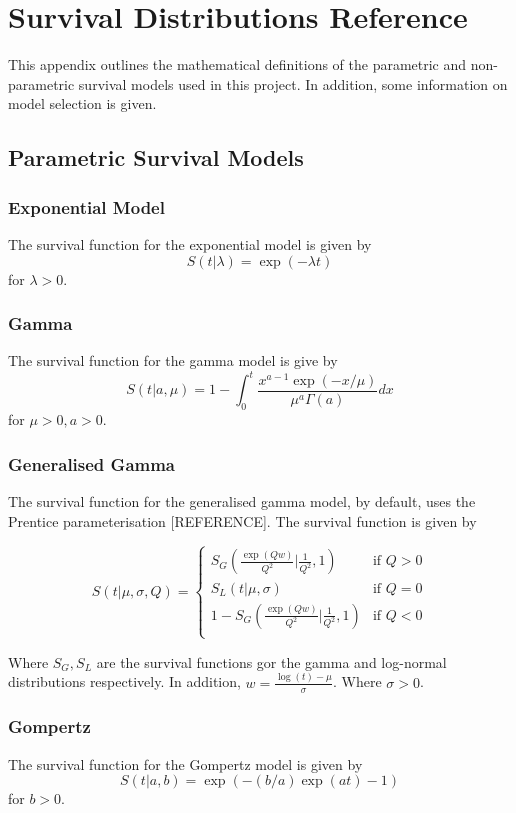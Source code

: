 \chapter{Survival Distributions Reference}

This appendix outlines the mathematical definitions of the parametric and non-parametric survival models used in this project. In addition, some information on model selection is given. 

\section{Parametric Survival Models}\label{flexsurvDists}

\subsection{Exponential Model}
The survival function for the exponential model is given by \[S(t|\lambda) = \exp(-\lambda t)\] for $\lambda > 0$.

\subsection{Gamma}
The survival function for the gamma model is give by \[S(t|a,\mu) = 1 - \int_{0}^{t}\frac{x^{a-1}\exp(-x/ \mu)}{\mu^a \Gamma(a)}dx\] for $\mu > 0, a > 0$.

\subsection{Generalised Gamma}
The survival function for the generalised gamma model, by default, uses the Prentice parameterisation [REFERENCE]. The survival function is given by 

\[
S(t|\mu, \sigma, Q) = \begin{cases}
    S_G(\frac{\exp(Qw)}{Q^2}|\frac{1}{Q^2}, 1) & \text{if } Q > 0 \\
    S_L(t | \mu, \sigma) & \text{if } Q = 0 \\
    1 - S_G(\frac{\exp(Qw)}{Q^2}|\frac{1}{Q^2}, 1) & \text{if } Q < 0 \\
\end{cases}    
\]

Where $S_G, S_L$ are the survival functions gor the gamma and log-normal distributions respectively. In addition, $w = \frac{\log(t)-\mu}{\sigma}$. Where $\sigma > 0$.

\subsection{Gompertz}
The survival function for the Gompertz model is given by \[S(t|a,b) = \exp(-(b/a)\exp(at)-1)\] for $b > 0$.

